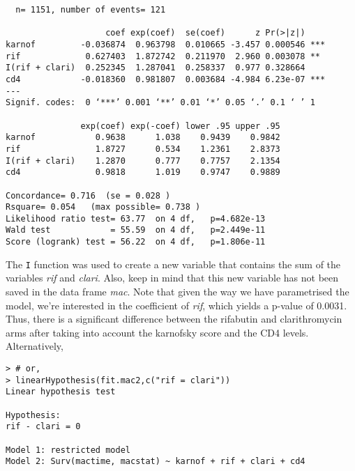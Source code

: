 \begin{enumerate}[(a)]
\begin{enumerate}[(i)]
\begin{footnotesize}
\begin{verbatim}
  n= 1151, number of events= 121 

                    coef exp(coef)  se(coef)      z Pr(>|z|)    
karnof         -0.036874  0.963798  0.010665 -3.457 0.000546 ***
rif             0.627403  1.872742  0.211970  2.960 0.003078 ** 
I(rif + clari)  0.252345  1.287041  0.258337  0.977 0.328664    
cd4            -0.018360  0.981807  0.003684 -4.984 6.23e-07 ***
---
Signif. codes:  0 ‘***’ 0.001 ‘**’ 0.01 ‘*’ 0.05 ‘.’ 0.1 ‘ ’ 1

               exp(coef) exp(-coef) lower .95 upper .95
karnof            0.9638      1.038    0.9439    0.9842
rif               1.8727      0.534    1.2361    2.8373
I(rif + clari)    1.2870      0.777    0.7757    2.1354
cd4               0.9818      1.019    0.9747    0.9889

Concordance= 0.716  (se = 0.028 )
Rsquare= 0.054   (max possible= 0.738 )
Likelihood ratio test= 63.77  on 4 df,   p=4.682e-13
Wald test            = 55.59  on 4 df,   p=2.449e-11
Score (logrank) test = 56.22  on 4 df,   p=1.806e-11
\end{verbatim}
\end{footnotesize}
The \verb|I| function was used to create a new variable that contains the sum of the variables \emph{rif} and \emph{clari}. Also, keep in mind that this new variable has not been saved in the data frame \emph{mac}. 
Note that given the way we have parametrised the model, we're interested in the coefficient of \emph{rif}, which yields a p-value of  0.0031. Thus, there is a significant difference between the rifabutin and clarithromycin arms after taking into account the karnofsky score and the CD4 levels. Alternatively,
\begin{spacing}{1.2}
\begin{footnotesize}
\begin{verbatim}
> # or,
> linearHypothesis(fit.mac2,c("rif = clari"))
Linear hypothesis test

Hypothesis:
rif - clari = 0

Model 1: restricted model
Model 2: Surv(mactime, macstat) ~ karnof + rif + clari + cd4


\end{verbatim}
\end{footnotesize}
\end{spacing}
\end{enumerate}
\end{enumerate}
